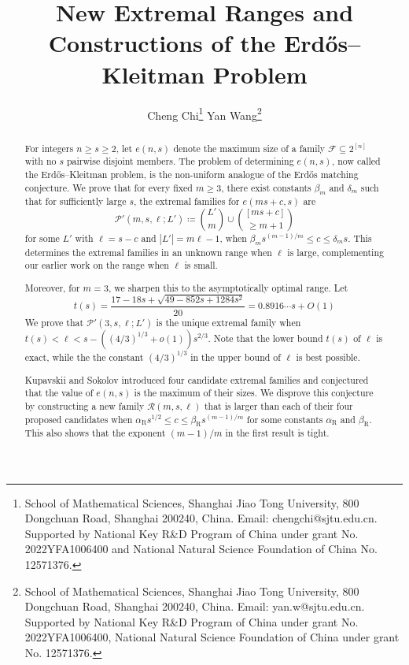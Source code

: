 \documentclass[10pt,a4paper]{article}
\numberwithin{equation}{section}
\theoremstyle{definition}
\newcommand{\F}{\mathcal F}
\begin{document}
\title{New Extremal Ranges and Constructions of the Erd\H{o}s--Kleitman Problem}
\author{
        Cheng Chi\thanks{School of Mathematical Sciences, Shanghai Jiao Tong University, 800 Dongchuan Road, Shanghai 200240, China.
                Email: chengchi@sjtu.edu.cn.
                Supported by National Key R\&D Program of China under grant No. 2022YFA1006400 and National Natural Science Foundation of China No. 12571376.
        }
        \qquad
        Yan Wang\thanks{School of Mathematical Sciences, Shanghai Jiao Tong University, 800 Dongchuan Road, Shanghai 200240, China.
                Email: yan.w@sjtu.edu.cn.
                Supported by National Key R\&D Program of China under grant No. 2022YFA1006400, National Natural Science Foundation of China under grant No. 12571376.
        }
}
\date{}
\maketitle

\begin{abstract}
        For integers $n\ge s\ge2$, let $e(n,s)$ denote the maximum size of a family $\F\subseteq2^{[n]}$ with no $s$ pairwise disjoint members.
        The problem of determining $e(n,s)$, now called the Erd\H{o}s--Kleitman problem, is the non-uniform analogue of the Erd\H{o}s matching conjecture.
        We prove that for every fixed $m\ge3$, there exist constants $\beta_m$ and $\delta_m$ such that for sufficiently large $s$, the extremal families for $e(ms+c,s)$ are
        \[
                \mathcal P'(m,s,\ell;L')\coloneqq \binom{L'}m\cup\binom{[ms+c]}{\ge m+1}
        \]
        for some $L'$ with $\ell=s-c$ and $|L'|=m\ell-1$, when $\beta_m s^{(m-1)/m}\le c\le \delta_m s$.
        This determines the extremal families in an unknown range when $\ell$ is large, complementing our earlier work on the range when $\ell$ is small.

        Moreover, for $m=3$, we sharpen this to the asymptotically optimal range.
        Let
        \[
                t(s)=
                \frac{17-18s+\sqrt{49-852s+1284s^2}}{20}
                =0.8916\cdots s+O(1)
        \]
        We prove that \(\mathcal P'(3,s,\ell;L')\) is the unique extremal family when $t(s)<\ell<s-((4/3)^{1/3}+o(1))s^{2/3}$.
        Note that the lower bound \(t(s)\) of $\ell$ is exact, while the the constant \((4/3)^{1/3}\) in the upper bound of $\ell$ is best possible.

        Kupavskii and Sokolov introduced four candidate extremal families and conjectured that the value of $e(n,s)$ is the maximum of their sizes.
        We disprove this conjecture by constructing a new family $\mathcal R(m,s,\ell)$ that is larger than each of their four proposed candidates when $\alpha_{\mathrm R}s^{1/2}\le c\le \beta_{\mathrm R}s^{(m-1)/m}$ for some constants $\alpha_{\mathrm R}$ and $\beta_{\mathrm R}$.
        This also shows that the exponent $(m-1)/m$ in the first result is tight.


\end{abstract}
\end{document}

